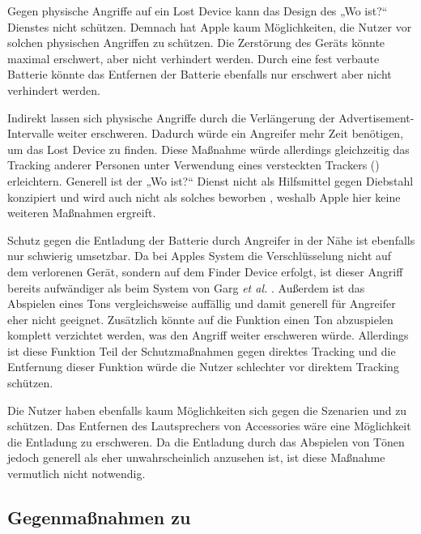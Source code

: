 Gegen physische Angriffe auf ein Lost Device kann das Design des „Wo ist?“ Dienstes nicht schützen.
Demnach hat Apple kaum Möglichkeiten, die Nutzer vor solchen physischen Angriffen zu schützen.
Die Zerstörung des Geräts könnte maximal erschwert, aber nicht verhindert werden.
Durch eine fest verbaute Batterie könnte das Entfernen der Batterie ebenfalls nur erschwert aber nicht verhindert werden.

Indirekt lassen sich physische Angriffe durch die Verlängerung der Advertisement-Intervalle weiter erschweren.
Dadurch würde ein Angreifer mehr Zeit benötigen, um das Lost Device zu finden.
Diese Maßnahme würde allerdings gleichzeitig das Tracking anderer Personen unter Verwendung eines versteckten Trackers () erleichtern.
Generell ist der „Wo ist?“ Dienst nicht als Hilfsmittel gegen Diebstahl konzipiert und wird auch nicht als solches beworben \cite{Apple_WoIst}, weshalb Apple hier keine weiteren Maßnahmen ergreift.

Schutz gegen die Entladung der Batterie durch Angreifer in der Nähe ist ebenfalls nur schwierig umsetzbar.
Da bei Apples System die Verschlüsselung nicht auf dem verlorenen Gerät, sondern auf dem Finder Device erfolgt, ist dieser Angriff bereits aufwändiger als beim System von Garg \textit{et al.} \cite{Garg_Secure_Tracker}.
Außerdem ist das Abspielen eines Tons vergleichsweise auffällig und damit generell für Angreifer eher nicht geeignet.
Zusätzlich könnte auf die Funktion einen Ton abzuspielen komplett verzichtet werden, was den Angriff weiter erschweren würde.
Allerdings ist diese Funktion Teil der Schutzmaßnahmen gegen direktes Tracking und die Entfernung dieser Funktion würde die Nutzer schlechter vor direktem Tracking schützen.

Die Nutzer haben ebenfalls kaum Möglichkeiten sich gegen die Szenarien  und  zu schützen. 
Das Entfernen des Lautsprechers von Accessories wäre eine Möglichkeit die Entladung zu erschweren.
Da die Entladung durch das Abspielen von Tönen jedoch generell als eher unwahrscheinlich anzusehen ist, ist diese Maßnahme vermutlich nicht notwendig.


\subsection{Gegenmaßnahmen zu }

